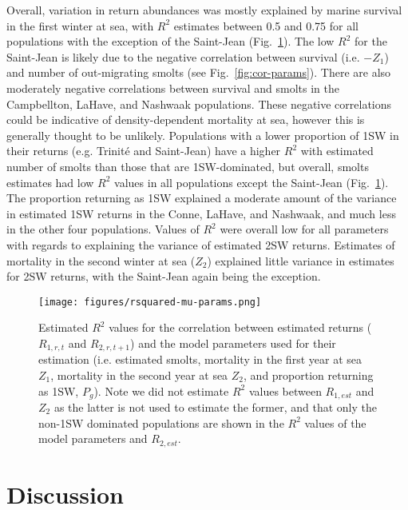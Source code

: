\documentclass[12pt]{article}
\newcommand{\Pg}{$P_g$\xspace}
\begin{document}
Overall, variation in return abundances was mostly explained by marine survival in the
first winter at sea, with $R^2$ estimates between 0.5 and 0.75 for all populations
with the exception of the Saint-Jean (Fig.~\ref{fig:mu-rsq}).
The low $R^2$ for the Saint-Jean is likely due to the negative correlation
between survival (i.e. $-Z_1$) and number of out-migrating smolts (see Fig.~\ref{fig:cor-params}).
There are also moderately negative correlations between survival and smolts in
the Campbellton, LaHave, and Nashwaak populations.
These negative correlations could be indicative of density-dependent
mortality at sea, however this is generally thought to be unlikely.
Populations with a lower proportion of 1SW in their returns (e.g. Trinit\'{e}
and Saint-Jean) have a higher $R^2$ with estimated number of smolts than those
that are 1SW-dominated, but overall, smolts estimates had low $R^2$ values in
all populations except the Saint-Jean (Fig.~\ref{fig:mu-rsq}).
The proportion returning as 1SW explained a moderate amount of the variance in
estimated 1SW returns in the Conne, LaHave, and Nashwaak, and much less in the
other four populations.
Values of $R^2$ were overall low for all parameters with regards to explaining
the variance of estimated 2SW returns. Estimates of mortality in the second winter at sea ($Z_2$)
explained little variance in estimates for 2SW returns, with the Saint-Jean again being the
exception.

\begin{figure}[htbp] \centering
    \texttt{[image: figures/rsquared-mu-params.png]}
    \caption{Estimated $R^2$ values for the correlation between estimated
        returns ($R_{1,r,t}$ and $R_{2,r,t+1}$) and the model parameters used
        for their estimation (i.e. estimated smolts, mortality in the first
        year at sea $Z_1$, mortality in the second year at sea $Z_2$, and
        proportion returning as 1SW, \Pg). Note we did not estimate $R^2$
        values between $R_{1,est}$ and $Z_2$ as the latter is not used to
        estimate the former, and that only the non-1SW dominated populations are
        shown in the $R^2$ values of the model parameters and $R_{2,est}$.}
    \label{fig:mu-rsq}
\end{figure}


\section*{Discussion}

\end{document}
